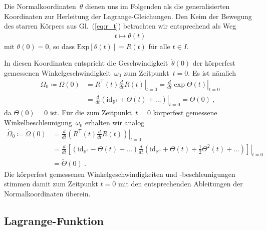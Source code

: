 \documentclass[10pt,a4paper]{article}
\newcommand{\trans}{^\mathsf{T}}
\begin{document}
Die Normalkoordinaten~$\theta$ dienen uns im Folgenden als die generalisierten Koordinaten zur Herleitung der Lagrange-Gleichungen.
Den Keim der Bewegung des starren Körpers aus Gl.~(\ref{eq:r_t}) betrachten wir entsprechend als Weg
\begin{align}
\label{eq:theta_t}
	t\mapsto\theta(t)
\end{align}
mit $\theta(0)=0$, so dass $\mathrm{Exp}[\theta(t)]=R(t)$ für alle $t\in I$.

In diesen Koordinaten entspricht die Geschwindigkeit~$\dot{\theta}(0)$ der körperfest gemessenen Winkelgeschwindigkeit~$\omega_0$ zum Zeitpunkt~$t=0$.
Es ist nämlich
\begin{align}
	\Omega_0 \coloneqq \Omega(0) &=
	\left.	
	R\trans(t)\frac{d}{dt}R(t)
	\right|_{t=0}
	=
	\left.	
	\frac{d}{dt}\exp\Theta(t)
	\right|_{t=0}
	\nonumber\\
	\label{eq:omega_dot_theta}
	&=
	\left.	
	\frac{d}{dt}(\mathrm{id}_{\mathbb{R}^3} + \Theta(t) + \ldots)
	\right|_{t=0}
	=\dot{\Theta}(0)
	\ ,
\end{align}
da $\Theta(0)=0$ ist.
Für die zum Zeitpunkt~$t=0$ körperfest gemessene Winkelbeschleunigung~$\dot{\omega}_0$ erhalten wir analog
\begin{align}
	\dot{\Omega}_0 \coloneqq \dot{\Omega}(0) &=
	\left.
	\frac{d}{dt}
	\left(
	R\trans(t)\frac{d}{dt}R(t)
	\right)
	\right|_{t=0}
	\nonumber\\
	&=
	\left.
	\frac{d}{dt}
	\left[
	(\mathrm{id}_{\mathbb{R}^3} - \Theta(t) + \ldots)
	\frac{d}{dt}
	\left(
		\mathrm{id}_{\mathbb{R}^3} 
		+ \Theta(t)
		+ \frac{1}{2}\Theta^2(t)
		+ \ldots
	\right)
	\right]
	\right|_{t=0}
	\nonumber\\
	\label{eq:dot_omega_ddot_theta}
	&=\ddot{\Theta}(0)
	\ .
\end{align}
Die körperfest gemessenen Winkelgeschwindigkeiten und -beschleunigungen stimmen damit zum Zeitpunkt $t=0$ mit den entsprechenden Ableitungen der Normalkoordinaten überein.

\subsection{Lagrange-Funktion}
\end{document}
